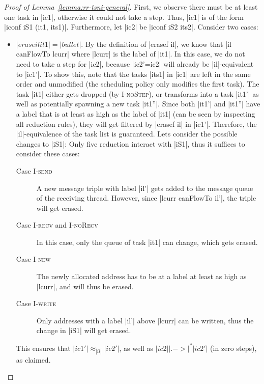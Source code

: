 \begin{proof}[Proof of Lemma~\ref{lemma:rr-tsni-general}]
  First, we observe there must be at least one task in |ic1|, otherwise
  it could not take a step.  Thus, |ic1| is of the form
  |iconf iS1 (it1, its1)|.
  Furthermore, let |ic2| be |iconf iS2 its2|.
  Consider two cases:
  \begin{itemize}
    \item $|erase il it1|=|bullet|$.
    By the definition of |erasef il|, we know that |il canFlowTo lcurr|
    where |lcurr| is the label of |it1|.
    In this case, we do not need to take a step for
    |ic2|, because |ic2'=ic2| will already be |il|-equivalent to |ic1'|.
    To show this, note that the tasks |its1| in |ic1| are left in the
    same order and unmodified (the scheduling policy only
    modifies the first task). The task |it1| either
    gets dropped (by \textsc{I-noStep}), or
    transforms into a task |it1'| as well as potentially spawning a new
    task |it1''|.  Since both |it1'| and |it1''| have a label that is
    at least as high as the label of |it1| (can be seen
    by inspecting all reduction rules), they will get filtered
    by |erasef il| in |ic1'|.  Therefore, the |il|-equivalence of the
    task list is guaranteed.
    Lets consider the possible changes to |iS1|:
    Only five reduction interact with |iS1|,
    thus it suffices to consider these cases:
    \begin{description}
      \item[Case \textsc{I-send}]
      A new message triple with label |il'| gets added to the message
      queue of the receiving thread.  However, since |lcurr canFlowTo il'|,
      the triple will get erased.
      \item[Case \textsc{I-recv} and \textsc{I-noRecv}]
      In this case, only the queue of
      task |it1| can change, which gets erased.
      \item[Case \textsc{I-new}] The newly allocated address has to be at a
      label at least as high as |lcurr|, and will thus be erased.
      \item[Case \textsc{I-write}] Only addresses with a label |il'| above
      |lcurr| can be written, thus the change in |iS1| will get erased.
    \end{description}
    This ensures that $|ic1'|\approx_{|il|}|ic2'|$, as well as
    $|ic2| |.->|^* |ic2'|$ (in zero steps), as claimed.

\end{itemize}
\end{proof}
